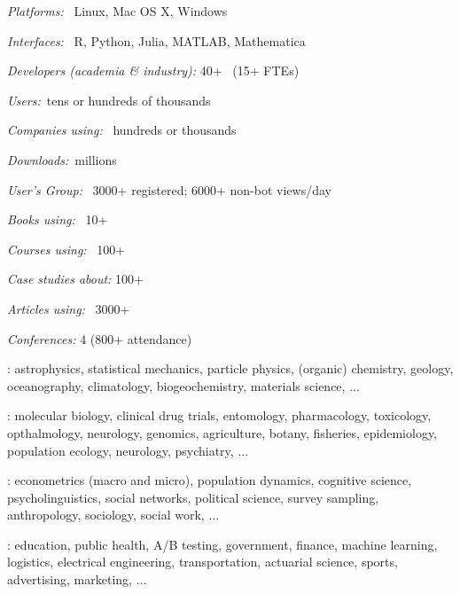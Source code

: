 \documentclass[10pt]{report}
\begin{document}
\begin{subitemize}
\item \textit{Platforms:} \ Linux, Mac OS X, Windows
\vspace*{-4pt}
\item \textit{Interfaces:} \ R, Python, Julia, MATLAB, Mathematica
\vspace*{-4pt}
\item \textit{Developers (academia \& industry):} 40+ \ {\small (15+ FTEs)}
\vspace*{-4pt}
\item \textit{Users:}\ tens or hundreds of thousands
\vspace*{-4pt}
\item \textit{Companies using:} \ hundreds or thousands
\vspace*{-4pt}
\item \textit{Downloads:}\ millions
\vspace*{-4pt}
\item \textit{User's Group:} \ 3000+ registered; 6000+ non-bot views/day
\vspace*{-4pt}
\item \textit{Books using:} \ 10+
\vspace*{-4pt}
\item \textit{Courses using:} \ 100+
\vspace*{-4pt}
\item \textit{Case studies about:} 100+
\vspace*{-4pt}
\item \textit{Articles using:} \ 3000+
\vspace*{-4pt}
\item \textit{Conferences:} 4 (800+ attendance)
\end{subitemize}

%
\begin{subitemize}
\item {}: {\footnotesize
astrophysics, statistical mechanics, particle physics, (organic) chemistry, geology, oceanography, climatology, biogeochemistry, materials science, $\ldots$
}
\vspace*{-3pt}
\item {}: {\footnotesize
molecular biology, clinical drug trials, entomology, pharmacology,
toxicology, opthalmology, neurology, genomics, agriculture, botany, fisheries,
epidemiology, population ecology, neurology, psychiatry, $\ldots$
}
\vspace*{-3pt}
\item {}: {\footnotesize
 econometrics (macro and micro), population dynamics, cognitive
 science, psycholinguistics, social networks, political science,
 survey sampling, anthropology, sociology, social work, $\ldots$
}
\vspace*{-3pt}
\item {}: {\footnotesize education, public health, A/B testing,
government, finance, machine learning, logistics, electrical engineering,  transportation, actuarial science, sports, advertising, marketing, $\ldots$}
\end{subitemize}
\end{document}
